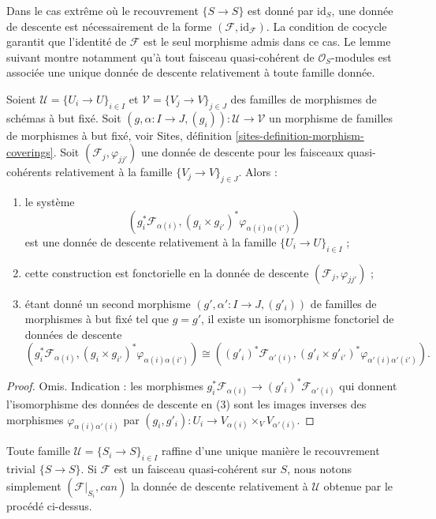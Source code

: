 \medskip\noindent
Dans le cas extrême où le recouvrement $\{S \to S\}$ est donné par
$\text{id}_S$, une donnée de descente est nécessairement de la forme
$(\mathcal{F}, \text{id}_\mathcal{F})$. La condition de cocycle garantit que
l'identité de $\mathcal{F}$ est le seul morphisme admis dans ce cas. Le lemme
suivant montre notamment qu'à tout faisceau quasi-cohérent de
$\mathcal{O}_S$-modules est associée une unique donnée de descente relativement
à toute famille donnée.

\begin{lemma}
\label{lemma-refine-descent-datum}
Soient $\mathcal{U} = \{U_i \to U\}_{i \in I}$ et
$\mathcal{V} = \{V_j \to V\}_{j \in J}$ des familles de morphismes de
schémas à but fixé. Soit
$(g, \alpha : I \to J, (g_i)) : \mathcal{U} \to \mathcal{V}$ un morphisme
de familles de morphismes à but fixé, voir Sites, définition
\ref{sites-definition-morphism-coverings}. Soit
$(\mathcal{F}_j, \varphi_{jj'})$ une donnée de descente pour les faisceaux
quasi-cohérents relativement à la famille $\{V_j \to V\}_{j \in J}$. Alors :
\begin{enumerate}
\item le système
$$
\left(g_i^*\mathcal{F}_{\alpha(i)},
(g_i \times g_{i'})^*\varphi_{\alpha(i)\alpha(i')}\right)
$$
est une donnée de descente relativement à la famille
$\{U_i \to U\}_{i \in I}$ ;
\item cette construction est
fonctorielle en la donnée de descente $(\mathcal{F}_j, \varphi_{jj'})$ ;
\item étant donné un second morphisme
$(g', \alpha' : I \to J, (g'_i))$ de familles de morphismes à but fixé tel
que $g = g'$, il existe un isomorphisme fonctoriel de données de descente
$$
(g_i^*\mathcal{F}_{\alpha(i)},
(g_i \times g_{i'})^*\varphi_{\alpha(i)\alpha(i')})
\cong
((g'_i)^*\mathcal{F}_{\alpha'(i)},
(g'_i \times g'_{i'})^*\varphi_{\alpha'(i)\alpha'(i')}).
$$
\end{enumerate}
\end{lemma}

\begin{proof}
Omis. Indication : les morphismes
$g_i^*\mathcal{F}_{\alpha(i)} \to (g'_i)^*\mathcal{F}_{\alpha'(i)}$ qui
donnent l'isomorphisme des données de descente en (3) sont les images
inverses des morphismes $\varphi_{\alpha(i)\alpha'(i)}$ par
$(g_i, g'_i) : U_i \to V_{\alpha(i)} \times_V V_{\alpha'(i)}$.
\end{proof}

\noindent
Toute famille $\mathcal{U} = \{S_i \to S\}_{i \in I}$ raffine d'une unique
manière le recouvrement trivial $\{S \to S\}$. Si $\mathcal{F}$ est un
faisceau quasi-cohérent sur $S$, nous notons simplement
$(\mathcal{F}|_{S_i}, can)$ la donnée de descente relativement à
$\mathcal{U}$ obtenue par le procédé ci-dessus.

